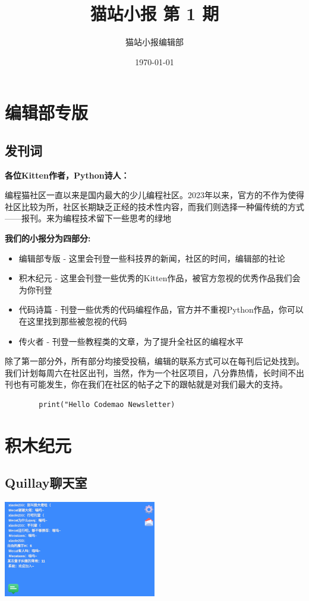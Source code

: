\documentclass[UTF8,fontset=fandol]{article}
\title{猫站小报 第 1 期}
\author{猫站小报编辑部}
\date{\today}
\begin{document}
	\maketitle
	\section{编辑部专版}
	\subsection{发刊词}
	
	\noindent
	\textbf{各位Kitten作者，Python诗人：} 
	
	编程猫社区一直以来是国内最大的少儿编程社区。2023年以来，官方的不作为使得社区比较为所，社区长期缺乏正经的技术性内容，而我们则选择一种偏传统的方式——报刊。来为编程技术留下一些思考的绿地
	
	\noindent
	\textbf{我们的小报分为四部分:}
	
	\begin{itemize}
		\item 编辑部专版 - 这里会刊登一些科技界的新闻，社区的时间，编辑部的社论
		\item 积木纪元 - 这里会刊登一些优秀的Kitten作品，被官方忽视的优秀作品我们会为你刊登
		\item 代码诗篇 - 刊登一些优秀的代码编程作品，官方并不重视Python作品，你可以在这里找到那些被忽视的代码
		\item 传火者 - 刊登一些教程类的文章，为了提升全社区的编程水平
	\end{itemize}
	
	除了第一部分外，所有部分均接受投稿，编辑的联系方式可以在每刊后记处找到。我们计划每周六在社区出刊，当然，作为一个社区项目，八分靠热情，长时间不出刊也有可能发生，你在我们在社区的帖子之下的跟帖就是对我们最大的支持。
	
	\begin{verbatim}
		print("Hello Codemao Newsletter)
	\end{verbatim}
	\pagebreak
	
	\section{积木纪元}
	\subsection{Quillay聊天室}
	\includegraphics[width=0.5\textwidth]{assets/01/kitten-1.png}
	
\end{document}
